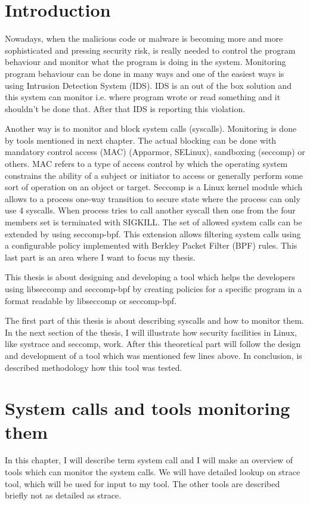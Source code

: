 
\chapter{Introduction}
Nowadays, when the malicious code or malware is becoming more and more sophisticated and pressing security risk, is really needed to control the program behaviour and monitor what the program is doing in the system.
Monitoring program behaviour can be done in many ways and one of the easiest ways is using Intrusion Detection System (IDS).
IDS is an out of the box solution and this system can monitor i.e. where program wrote or read something and it shouldn't be done that.
After that IDS is reporting this violation. %

Another way is to monitor and block system calls (syscalls).
Monitoring is done by tools mentioned in next chapter.
The actual blocking can be done with mandatory control access (MAC) (Apparmor, SELinux), sandboxing (seccomp) or others.
MAC refers to a type of access control by which the operating system constrains the ability of a subject or initiator to access or generally perform some sort of operation on an object or target.
Seccomp is a Linux kernel module which allows to a process one-way transition to secure state where the process can only use 4 syscalls.
When process tries to call another syscall then one from the four members set is terminated with SIGKILL.
The set of allowed system calls can be extended by using seccomp-bpf.
This extension allows filtering system calls using a configurable policy implemented with Berkley Packet Filter (BPF) rules.
This last part is an area where I want to focus my thesis.

This thesis is about designing and developing a tool which helps the developers using libseccomp and seccomp-bpf by creating policies for a specific program in a format readable by libseccomp or seccomp-bpf.

The first part of this thesis is about describing syscalls and how to monitor them.
In the next section of the thesis, I will illustrate how security facilities in Linux, like systrace and seccomp, work.
After this theoretical part will follow the design and development of a tool which was mentioned few lines above.
In conclusion, is described methodology how this tool was tested.


\chapter{System calls and tools monitoring them}
In this chapter, I will describe term system call and I will make an overview of tools which can monitor the system calls.
We will have detailed lookup on strace tool, which will be used for input to my tool. The other tools are described briefly not as detailed as strace.

